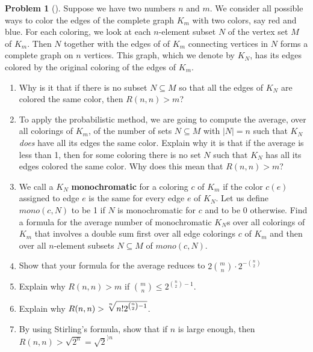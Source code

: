 \documentclass[10pt,]{book}
\newcommand{\terminology}[1]{\textbf{#1}}
\theoremstyle{plain}
\theoremstyle{definition}
\newtheorem{activity}[project]{Problem}
\theoremstyle{definition}
\numberwithin{equation}{chapter}
\newcommand{\importantarrow}{\Rightarrow}
\begin{document}
\begin{activity}[]\marginsymbol[-1em]{\pdftooltip{$\importantarrow$}{especially interesting}} \label{activity-86}
Suppose we have two numbers \(n\) and \(m\). We consider all possible ways to color the edges of the complete graph \(K_m\) with two colors, say red and blue. For each coloring, we look at each \(n\)-element subset \(N\) of the vertex set \(M\) of \(K_m\). Then \(N\) together with the edges of of \(K_m\) connecting vertices in \(N\) forms a complete graph on \(n\) vertices. This graph, which we denote by \(K_N\), has its edges colored by the original coloring of the edges of \(K_m\).%
\begin{enumerate}[font=\bfseries,label=(\alph*),ref=\alph*]
\item\label{task-80} \marginsymbol[-2.5em]{} Why is it that if there is no subset \(N\subseteq M\) so that all the edges of \(K_N\) are colored the same color, then \(R(n,n)>m\)?%
\item\label{task-81} \marginsymbol[-2.5em]{} To apply the probabilistic method, we are going to compute the average, over all colorings of \(K_m\), of the number of sets \(N\subseteq M\) with \(|N|=n\) such that \(K_N\) \emph{does} have all its edges the same color. Explain why it is that if the average is less than 1, then for some coloring there is no set \(N\) such that \(K_N\) has all its edges colored the same color.  Why does this mean that \(R(n,n)>m\)?%
\item\label{task-82} \marginsymbol[-2.5em]{} We call a \(K_N\) \terminology{monochromatic} for a coloring \(c\) of \(K_m\) if the color \(c(e)\) assigned to edge \(e\) is the same for every edge \(e\) of \(K_N\).  Let us define \({ mono}(c,N)\) to be 1 if \(N\) is monochromatic for \(c\) and to be 0 otherwise.  Find a formula for the average number of monochromatic \(K_N\)s over all colorings of \(K_m\) that involves a double sum first over all edge colorings \(c\) of \(K_m\) and then over all \(n\)-element subsets \(N\subseteq M\) of \({
mono}(c,N)\).%
\item\label{task-83} \marginsymbol[-2.5em]{} Show that your formula for the average reduces to \(2\binom{m}{n}\cdot2^{-\binom{n}{2}}\)%
\item\label{task-84} \marginsymbol[-2.5em]{} Explain why \(R(n,n)>m\) if \(\binom{m}{n}\le 2^{\binom{n}{2} -1}\).%
\item\label{task-85}  Explain why \(R(n,n)>\root n \of {n!2^{\binom{n}{2}-1}}\).%
\item\label{task-86} \marginsymbol[-2.5em]{} By using Stirling's formula, show that if \(n\) is large enough, then \(R(n,n) > \sqrt{2^n} = \sqrt{2}^{\rangle n}\)%
\end{enumerate}
\end{activity}
\typeout{************************************************}
\typeout{************************************************}
\end{document}
